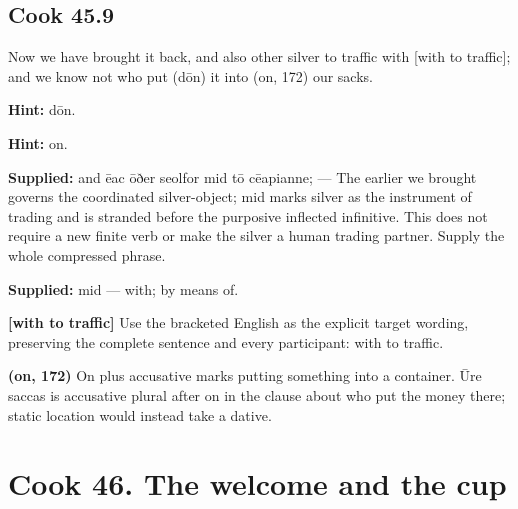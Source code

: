 \par\begin{minipage}{\linewidth}\raggedright
\subsection*{Cook 45.9}

Now we have brought it back, and also other silver to traffic with [with to traffic]; and we know not who put (dōn) it into (on, 172) our sacks.

\textbf{Hint:} dōn.

\textbf{Hint:} on.

\end{minipage}\par\addvspace{4pt}

\textbf{Supplied:} and ēac ōðer seolfor mid tō cēapianne; — The earlier we brought governs the coordinated silver-object; mid marks silver as the instrument of trading and is stranded before the purposive inflected infinitive. This does not require a new finite verb or make the silver a human trading partner. Supply the whole compressed phrase.

\textbf{Supplied:} mid — with; by means of.

\textbf{[with to traffic]} Use the bracketed English as the explicit target wording, preserving the complete sentence and every participant: with to traffic.

\textbf{(on, 172)} On plus accusative marks putting something into a container. Ūre saccas is accusative plural after on in the clause about who put the money there; static location would instead take a dative.

\section*{Cook 46. The welcome and the cup}

